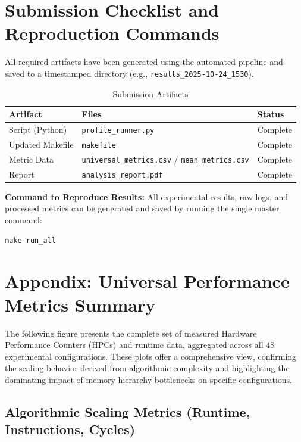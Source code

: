 \documentclass[11pt, a4paper]{article}
\begin{document}
\section{Submission Checklist and Reproduction Commands}

All required artifacts have been generated using the automated pipeline and saved to a timestamped directory (e.g., \texttt{results\_2025-10-24\_1530}).

\begin{table}[h]
\centering
\caption{Submission Artifacts}
\label{tab:submission_artifacts}
\begin{tabular}{l l l}
\toprule
\textbf{Artifact} & \textbf{Files} & \textbf{Status} \\
\midrule
Script (Python) & \texttt{profile\_runner.py} & Complete \\
Updated Makefile & \texttt{makefile} & Complete \\
Metric Data & \texttt{universal\_metrics.csv} / \texttt{mean\_metrics.csv} & Complete \\
Report & \texttt{analysis\_report.pdf} & Complete \\
\bottomrule
\end{tabular}
\end{table}

\noindent\textbf{Command to Reproduce Results:} All experimental results, raw logs, and processed metrics can be generated and saved by running the single master command:

\begin{verbatim}
make run_all
\end{verbatim}

\section{Appendix: Universal Performance Metrics Summary}

The following figure presents the complete set of measured Hardware Performance Counters (HPCs) and runtime data, aggregated across all $48$ experimental configurations. These plots offer a comprehensive view, confirming the scaling behavior derived from algorithmic complexity and highlighting the dominating impact of memory hierarchy bottlenecks on specific configurations.

\subsection{Algorithmic Scaling Metrics (Runtime, Instructions, Cycles)}
\end{document}
